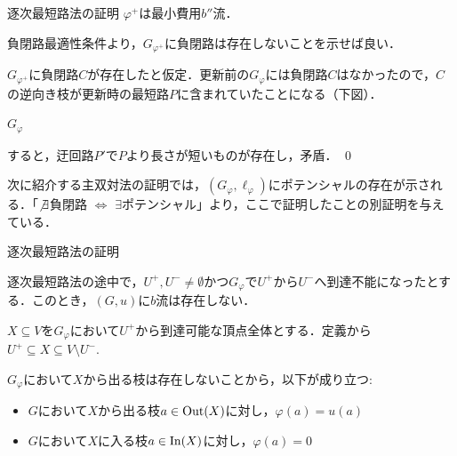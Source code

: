 \documentclass[14pt,aspectratio=169,xcolor=dvipsnames,table,onlytextwidth,dvipdfmx]{beamer}
\begin{document}
\begin{frame}[t]{逐次最短路法の証明}
    \small
     $\varphi^+$は最小費用$b''$流．

    \bigskip
    負閉路最適性条件より，$G_{\varphi^+}$に負閉路は存在しないことを示せば良い．

    $G_{\varphi^+}$に負閉路$C$が存在したと仮定．更新前の$G_\varphi$には負閉路$C$はなかったので，$C$の逆向き枝が更新時の最短路$P$に含まれていたことになる（下図）．

    \begin{center}
        $G_\varphi$
    \end{center}
    
    すると，迂回路$P'$で$P$より長さが短いものが存在し，矛盾． \qed

    \vfill
    \footnotesize
    次に紹介する主双対法の証明では，$(G_\varphi, \ell_\varphi)$にポテンシャルの存在が示される．「$\not\exists$負閉路 $\iff$ $\exists$ポテンシャル」より，ここで証明したことの別証明を与えている．
\end{frame}

\begin{frame}[t]{逐次最短路法の証明}
    \small
    \begin{lemma}
        逐次最短路法の途中で，$U^+, U^- \neq \emptyset$かつ$G_\varphi$で$U^+$から$U^-$へ到達不能になったとする．このとき，$(G, u)$に$b$流は存在しない．
    \end{lemma}

    $X \subseteq V$を$G_\varphi$において$U^+$から到達可能な頂点全体とする．定義から$U^+ \subseteq X \subseteq V \setminus U^-$.

    \bigskip
    $G_\varphi$において$X$から出る枝は存在しないことから，以下が成り立つ:
    \begin{itemize}
        \item $G$において$X$から出る枝$a \in \operatorname{Out}(X)$に対し，$\varphi(a) = u(a)$
        \item $G$において$X$に入る枝$a \in \operatorname{In}(X)$に対し，$\varphi(a) = 0$
    \end{itemize}
\end{frame}
\end{document}
